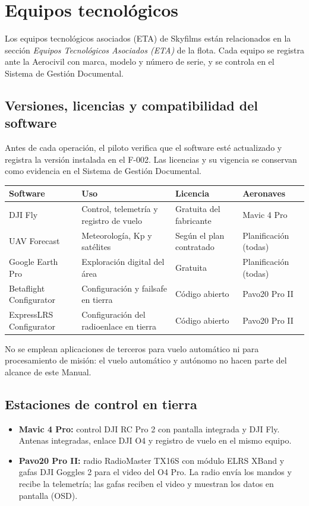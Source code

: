 \section{Equipos tecnológicos}

Los equipos tecnológicos asociados (ETA) de Skyfilms están relacionados en la sección \textit{Equipos Tecnológicos Asociados (ETA)} de la flota. Cada equipo se registra ante la Aerocivil con marca, modelo y número de serie, y se controla en el Sistema de Gestión Documental.

\subsection{Versiones, licencias y compatibilidad del software}

Antes de cada operación, el piloto verifica que el software esté actualizado y registra la versión instalada en el F-002. Las licencias y su vigencia se conservan como evidencia en el Sistema de Gestión Documental.

\renewcommand{\arraystretch}{1.3}
\begin{longtable}{|p{3.2cm}|p{3.8cm}|p{3.6cm}|p{3.4cm}|}
\hline
\textbf{Software} & \textbf{Uso} & \textbf{Licencia} & \textbf{Aeronaves} \\ \hline
DJI Fly & Control, telemetría y registro de vuelo & Gratuita del fabricante & Mavic 4 Pro \\ \hline
UAV Forecast & Meteorología, Kp y satélites & Según el plan contratado & Planificación (todas) \\ \hline
Google Earth Pro & Exploración digital del área & Gratuita & Planificación (todas) \\ \hline
Betaflight Configurator & Configuración y failsafe en tierra & Código abierto & Pavo20 Pro II \\ \hline
ExpressLRS Configurator & Configuración del radioenlace en tierra & Código abierto & Pavo20 Pro II \\ \hline
\end{longtable}

No se emplean aplicaciones de terceros para vuelo automático ni para procesamiento de misión: el vuelo automático y autónomo no hacen parte del alcance de este Manual.

\subsection{Estaciones de control en tierra}

\begin{itemize}
\item \textbf{Mavic 4 Pro:} control DJI RC Pro 2 con pantalla integrada y DJI Fly. Antenas integradas, enlace DJI O4 y registro de vuelo en el mismo equipo.
\item \textbf{Pavo20 Pro II:} radio RadioMaster TX16S con módulo ELRS XBand y gafas DJI Goggles 2 para el video del O4 Pro. La radio envía los mandos y recibe la telemetría; las gafas reciben el video y muestran los datos en pantalla (OSD).
\end{itemize}

